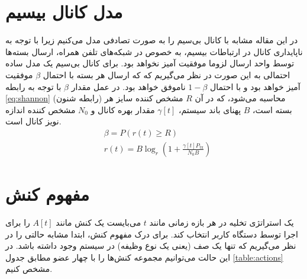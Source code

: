 \section{مدل کانال بیسیم}
\label{sec:wireless}
در این مقاله مشابه با \cite{Liu} کانال بی‌سیم را به صورت تصادفی مدل می‌کنیم زیرا با توجه به ناپایداری کانال در ارتباطات بیسیم، به خصوص در شبکه‌های تلفن همراه، ارسال بسته‌ها توسط واحد ارسال لزوما موفقیت آمیز نخواهد بود. برای کانال بی‌سیم یک مدل ساده احتمالی به این صورت در نظر می‌گیریم که که ارسال هر بسته با احتمال \(\beta\) موفقیت آمیز خواهد بود و با احتمال \(1 - \beta\) ناموفق خواهد بود. در عمل مقدار \(\beta\) با توجه به رابطه \ref{eq:shannon} (رابطه شنون) محاسبه می‌شود، که در آن \(R\) مشخص کننده سایز هر بسته است، \(B\) پهنای باند سیستم، \(\gamma[t]\) مقدار بهره کانال و \(N_0\) مشخص کننده اندازه نویز کانال است.
\begin{equation}
	\label{eq:shannon}
		\begin{aligned}
				&\beta=P(r(t) \geq R) \\
				&r(t)=B \log _{r}\left(1+\frac{\gamma[t] P_{\mathrm{tx}}}{N_0 B}\right)
		\end{aligned}
\end{equation}
\section{مفهوم کنش}
یک استراتژی تخلیه در هر بازه زمانی مانند \(t\) می‌بایست یک کنش مانند \(A[t]\) را برای اجرا توسط دستگاه کاربر انتخاب کند. برای درک مفهوم کنش، ابتدا مشابه \cite{Liu} حالتی را در نظر می‌گیریم که تنها یک صف (یعنی یک نوع وظیفه) در سیستم وجود داشته باشد. در این حالت می‌توانیم مجموعه کنش‌ها را با چهار عضو مطابق جدول \ref{table:actions} مشخص کنیم.

